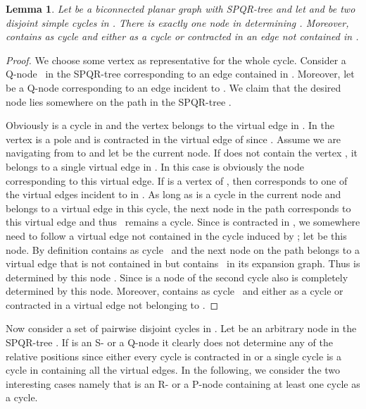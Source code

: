 \documentclass{scrartcl}
\newcommand{\1}[1]{{\normalfont \ensuremath{#1^{\tiny\circled{1}}}}} \newcommand{\2}[1]{{\normalfont \ensuremath{#1^{\tiny\circled{2}}}}} \renewcommand{\k}[1]{{\normalfont \ensuremath{#1^{\tiny\circled{k}}}}} \newcommand{\proj}[2]{\ensuremath{\left.#1\right|_{#2}}} \newcommand{\eps}{\varepsilon}
\theoremstyle{plain} \newtheorem{theorem}{Theorem} \newcounter{lemmacounter} \setcounter{lemmacounter}{0} \newtheorem{lemma}[lemmacounter]{Lemma} \newtheorem{fact}{Fact}  \newtheorem{corollary}{Corollary} \theoremstyle{definition} \newtheorem{definition}{Definition}
\begin{document}
\begin{lemma}
  \label{lem:determining-pos-by-ex-one}
  Let  be a biconnected planar graph with SPQR-tree 
  and let  and  be two disjoint simple cycles in .  There
  is exactly one node  in  determining
  .  Moreover,  contains  as cycle
   and  either as a cycle or contracted in an edge not
  contained in .
\end{lemma}
\begin{proof}
  We choose some vertex  as representative for the whole
  cycle.  Consider a Q-node~ in the SPQR-tree 
  corresponding to an edge contained in .  Moreover, let 
  be a Q-node corresponding to an edge incident to .  We claim that
  the desired node  lies somewhere on the path  in the SPQR-tree .

  Obviously  is a cycle in  and the vertex  belongs to
  the virtual edge in .  In  the vertex  is a
  pole and  is contracted in the virtual edge of 
  since .  Assume we are navigating from  to
   and let  be the current node.  If  does
  not contain the vertex , it belongs to a single virtual edge in
  .  In this case  is obviously the node
  corresponding to this virtual edge.  If  is a vertex of
  , then  corresponds to one of the virtual
  edges incident to  in .  As long as  is a
  cycle in the current node and  belongs to a virtual edge in this
  cycle, the next node in the path corresponds to this virtual edge
  and thus~ remains a cycle.  Since  is contracted in
  , we somewhere need to follow a virtual edge not contained in
  the cycle induced by ; let  be this node.  By definition
   contains  as cycle~ and the next node on the path
  belongs to a virtual edge that is not contained in  but
  contains~ in its expansion graph.  Thus  is
  determined by this node .  Since  is a node of the second
  cycle  also  is completely determined by this
  node.  Moreover,  contains  as cycle~ and 
  either as a cycle or contracted in a virtual edge not belonging to
  .
\end{proof}

Now consider a set of pairwise disjoint cycles  in .  Let  be an arbitrary node in the SPQR-tree
.  If  is an S- or a Q-node it clearly does not
determine any of the relative positions since either every cycle is
contracted in  or a single cycle is a cycle in
 containing all the virtual edges.  In the following, we
consider the two interesting cases namely that  is an R- or a
P-node containing at least one cycle as a cycle.
\end{document}
